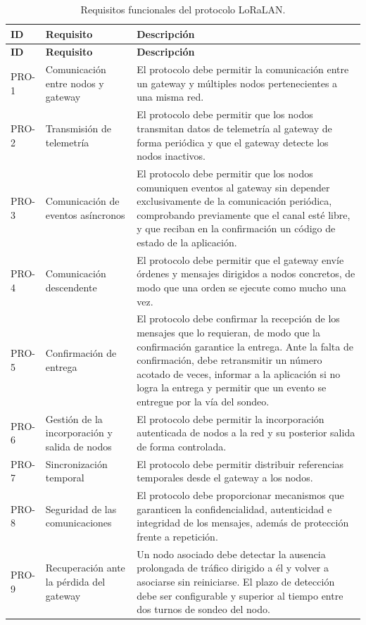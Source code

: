 \begin{longtable}{@{}l p{} p{}@{}}
\caption{Requisitos funcionales del protocolo LoRaLAN.}\label{tab:pro}\\
\toprule
\textbf{ID} & \textbf{Requisito} & \textbf{Descripción} \\
\midrule
\endfirsthead
\toprule
\textbf{ID} & \textbf{Requisito} & \textbf{Descripción} \\
\midrule
\endhead
\bottomrule
\endfoot
PRO-1 & Comunicación entre nodos y gateway & El protocolo debe permitir la comunicación entre un gateway y múltiples nodos pertenecientes a una misma red. \\
\midrule
PRO-2 & Transmisión de telemetría & El protocolo debe permitir que los nodos transmitan datos de telemetría al gateway de forma periódica y que el gateway detecte los nodos inactivos. \\
\midrule
PRO-3 & Comunicación de eventos asíncronos & El protocolo debe permitir que los nodos comuniquen eventos al gateway sin depender exclusivamente de la comunicación periódica, comprobando previamente que el canal esté libre, y que reciban en la confirmación un código de estado de la aplicación. \\
\midrule
PRO-4 & Comunicación descendente & El protocolo debe permitir que el gateway envíe órdenes y mensajes dirigidos a nodos concretos, de modo que una orden se ejecute como mucho una vez. \\
\midrule
PRO-5 & Confirmación de entrega & El protocolo debe confirmar la recepción de los mensajes que lo requieran, de modo que la confirmación garantice la entrega. Ante la falta de confirmación, debe retransmitir un número acotado de veces, informar a la aplicación si no logra la entrega y permitir que un evento se entregue por la vía del sondeo. \\
\midrule
PRO-6 & Gestión de la incorporación y salida de nodos & El protocolo debe permitir la incorporación autenticada de nodos a la red y su posterior salida de forma controlada. \\
\midrule
PRO-7 & Sincronización temporal & El protocolo debe permitir distribuir referencias temporales desde el gateway a los nodos. \\
\midrule
PRO-8 & Seguridad de las comunicaciones & El protocolo debe proporcionar mecanismos que garanticen la confidencialidad, autenticidad e integridad de los mensajes, además de protección frente a repetición. \\
\midrule
PRO-9 & Recuperación ante la pérdida del gateway & Un nodo asociado debe detectar la ausencia prolongada de tráfico dirigido a él y volver a asociarse sin reiniciarse. El plazo de detección debe ser configurable y superior al tiempo entre dos turnos de sondeo del nodo. \\
\end{longtable}


